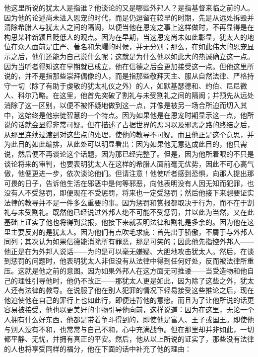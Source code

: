 他这里所说的犹太人是指谁？他谈论的又是哪些外邦人？是指基督来临之前的人。因为他的论述尚未进入恩宠的时代，而是仍逗留在较早的时期，先是从远处拆毁并清除希腊人与犹太人之间的隔阂，以便当他在恩宠之事上这样做时，不再显得是在构思某种新颖且贬低人的观点。因为在早期，当这恩宠尚未如此彰显，犹太人的地位在众人面前是庄严、著名和荣耀的时候，并无分别；那么，在如此伟大的恩宠显示之后，他们还能为自己说什么呢；这就是为什么他以如此大的热诚确立这一点。因为当听者得知这在早期就已成立，他在信德之后会更加接受这一点。但他这里所说的，并不是指那些崇拜偶像的人，而是指那些敬拜天主、服从自然法律、严格持守一切（除了有助于虔敬的犹太礼仪之外）的人，如默基瑟德和、约伯、尼尼微人、科尔乃略。在这里，他首先突破了割礼与未受割礼之间的隔阂；并预先从远处消除了这一区别，以便不被怀疑地做到这一点，并像是被另一场合所迫而切入其中，这始终是他宗徒智慧的一个特点。因为如果他是在恩宠时期显示这一点，他所说的话就会显得非常可疑。但在描述了占据世界的恶习以及邪恶之路的终结之后，从那里连续过渡到对这些点的处理，使他的教导不可疑。而且他正是这个意思，并为此目的如此编排，从此处可以明显看出：因为如果他无意达成此目的，他只需说，然后便不再谈论这个话题，因为那已经完整了。但是，因为他所着眼的不只是谈论将来的审判，也要表明犹太人在这样的希腊人面前毫无优势，因此不可心高气傲，他便更进一步，依次谈论他们。但请注意！他使听者感到恐惧，向那人提出那可畏的日子，告诉他生活在邪恶中是何等邪恶，向他表明没有人因无知而犯罪，也没有人不受惩罚，即便现在不受惩罚，将来也一定受惩罚；然后他接下来想要证实法律的教导并不是一件多么重要的事。因为惩罚和赏报都取决于行为，而不在于割礼与未受割礼。既然他已经说过外邦人绝不可能不受惩罚，并以此为当然，又在此基础上证实了他也将得到赏报，他接下来就表明法律和割礼是多余的。因为他在这里主要反对的是犹太人。因为他们有点吹毛求疵：首先出于骄傲，不屑于与外邦人同列；其次认为如果信德能消除所有罪恶，那是可笑的；因此他先指控外邦人——他正是在为外邦人说话——为的是可以毫无嫌疑、大胆地攻击犹太人。然后，在谈到惩罚的问题时，他表明犹太人非但没有从法律中得到任何好处，反而被法律所重压。这就是他之前的意图。因为如果外邦人在这方面无可推诿——当受造物和他自己的理性引导他时，他仍不改正——那犹太人更是如此，因为除了这些之外，犹太人还有法律的教导。在说服了他在别人犯罪的情况下轻易接受这些推论之后，现在他迫使他在自己的罪行上也如此行，即便违背他的意愿。而且为了让他所说的话更容易被接受，他也以更美好的事物引导他向前，这样说道：因为在这里，无论一个人拥有什么好东西，他都是带着争斗得到的，即使他是富人、王子或国王。即使他与别人没有不和，也常常与自己不和，心中充满战争。但在那里却并非如此，一切都平静、无忧，并拥有真正的平安。然后，他从以上所说的证实了，那些没有法律的人也将享受同样的福分，他在下面的话中补充了他的理由：\par

